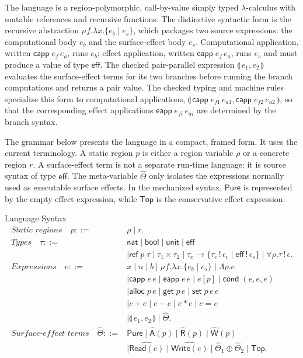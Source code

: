 \documentclass[10pt,a4paper]{article}
\newcommand{\Read}{\mathsf{Read}}
\newcommand{\Write}{\mathsf{Write}}
\newcommand{\Rhat}{\widehat{\mathsf{R}}}
\newcommand{\What}{\widehat{\mathsf{W}}}
\newcommand{\Ahat}{\widehat{\mathsf{A}}}
\newcommand{\Top}{\mathsf{Top}}
\newcommand{\Pure}{\mathsf{Pure}}
\newcommand{\capp}{\mathsf{capp}\;}
\newcommand{\eapp}{\mathsf{eapp}\;}
\newcommand{\cond}{\mathsf{cond}\;}
\newcommand{\alloc}{\mathsf{alloc}\;}
\newcommand{\getop}{\mathsf{get}\;}
\newcommand{\setop}{\mathsf{set}\;}
\newcommand{\pparl}{\mathopen{\llparenthesis}}
\newcommand{\pparr}{\mathclose{\rrparenthesis}}
\newcommand{\pairpar}[2]{\pparl\,#1,#2\,\pparr}
\newcommand{\thetahat}{\widehat{\Theta}}
\begin{document}
The language is a region-polymorphic, call-by-value simply typed
$\lambda$-calculus with mutable references and recursive functions. The
distinctive syntactic form is the recursive abstraction
$\mu f.\lambda x.\{e_b\mid e_s\}$, which packages two source expressions: the
computational body $e_b$ and the surface-effect body $e_s$.  Computational
application, written $\capp e_f\,e_a$, runs $e_b$; effect application, written
$\eapp e_f\,e_a$, runs $e_s$ and must produce a value of type
$\mathsf{eff}$. The checked pair-parallel expression $\pairpar{e_1}{e_2}$
evaluates the surface-effect terms for its two branches before running the
branch computations and returns a pair value. The checked typing and machine
rules specialize this form to computational applications,
$\pairpar{\capp e_{f1}\,e_{a1}}{\capp e_{f2}\,e_{a2}}$, so that the
corresponding effect applications $\eapp e_{fi}\,e_{ai}$ are determined by the
branch syntax.

The grammar below presents the language in a compact, framed form. It uses the
current terminology.  A static region $p$ is either a region variable $\rho$ or
a concrete region $r$. A surface-effect term is not a separate run-time
language: it is source syntax of type $\mathsf{eff}$.  The meta-variable
$\thetahat$ only isolates the expressions normally used as executable surface
effects.  In the mechanized syntax, $\Pure$ is represented by the empty effect
expression, while $\Top$ is the conservative effect expression.

\begin{formalbox}{Language Syntax}
\small
\begin{align*}
\textit{Static regions}\quad
p ::= {}& \rho \mid r.\\[.7ex]
\textit{Types}\quad
\tau ::= {}& \mathsf{nat}
  \mid \mathsf{bool}
  \mid \mathsf{unit}
  \mid \mathsf{eff}\\
& \mid \mathsf{ref}\;p\;\tau
  \mid \tau_1 \times \tau_2
  \mid \tau_x \to \{\tau_c\,!\,\epsilon_c \mid
                     \mathsf{eff}\,!\,\epsilon_s\}
  \mid \forall \rho.\tau\,!\,\epsilon.\\[.7ex]
\textit{Expressions}\quad
 e ::= {}& x \mid n \mid b
  \mid \mu f.\lambda x.\{e_b\mid e_s\}
  \mid \Lambda \rho.e\\
& \mid \capp e\,e
  \mid \eapp e\,e
  \mid e[p]
  \mid \cond(e,e,e)\\
& \mid \alloc p\,e
  \mid \getop p\,e
  \mid \setop p\,e\,e\\
& \mid e+e \mid e-e \mid e*e \mid e=e\\
& \mid \pairpar{e_1}{e_2}
  \mid \thetahat.\\[.7ex]
\textit{Surface-effect terms}\quad
\thetahat ::= {}& \Pure
  \mid \Ahat(p)
  \mid \Rhat(p)
  \mid \What(p)\\
& \mid \widehat{\Read(e)}
  \mid \widehat{\Write(e)}
  \mid \thetahat_1\oplus\thetahat_2
  \mid \Top.
\end{align*}
\end{formalbox}
\end{document}
